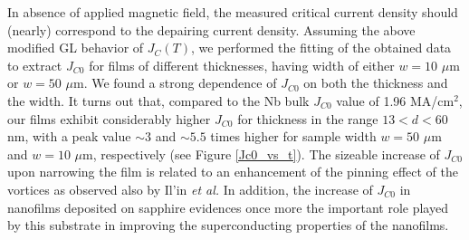 \documentclass[reprint,onecolumn,superscriptaddress,a4paper,nofootinbib,floatfix]{revtex4-1}
\begin{document}
In absence of applied magnetic field, the measured critical current density should (nearly) correspond to the depairing current density. Assuming the above modified GL behavior of $J_C(T)$, we performed the fitting of the obtained data to extract $J_{C0}$ for films of different thicknesses, having width of either $w =10$ $\mu$m or $w =50$ $\mu$m. We found a strong dependence of $J_{C0}$ on both the thickness and the width. It turns out that, compared to the Nb bulk $J_{C0}$ value of 1.96 MA/cm$^2$, our films exhibit considerably higher $J_{C0}$ for thickness in the range $13 < d < 60$ nm, with a peak value $\sim 3$ and $\sim 5.5$ times higher for sample width $w =50$ $\mu$m and $w =10$ $\mu$m, respectively (see Figure \ref{Jc0_vs_t}). The sizeable increase of $J_{C0}$ upon narrowing the film is related to an enhancement of the pinning effect of the vortices as observed also by Il'in \textit{et al.} \cite{Ilin2005} In addition, the increase of $J_{C0}$ in nanofilms deposited on sapphire evidences once more the important role played by this substrate in improving the superconducting properties of the nanofilms.
\end{document}
